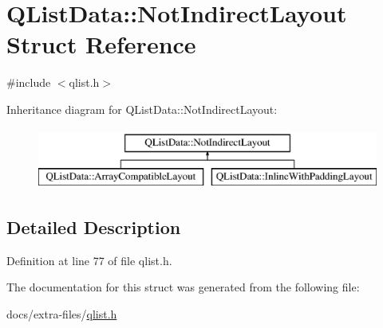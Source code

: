 \hypertarget{struct_q_list_data_1_1_not_indirect_layout}{}\section{Q\+List\+Data\+:\+:Not\+Indirect\+Layout Struct Reference}
\label{struct_q_list_data_1_1_not_indirect_layout}


{\ttfamily \#include $<$qlist.\+h$>$}

Inheritance diagram for Q\+List\+Data\+:\+:Not\+Indirect\+Layout\+:\begin{figure}[H]
\begin{center}
\leavevmode
\includegraphics[height=2.000000cm]{struct_q_list_data_1_1_not_indirect_layout}
\end{center}
\end{figure}


\subsection{Detailed Description}


Definition at line 77 of file qlist.\+h.



The documentation for this struct was generated from the following file\+:\begin{DoxyCompactItemize}
\item 
docs/extra-\/files/\hyperlink{qlist_8h}{qlist.\+h}\end{DoxyCompactItemize}
